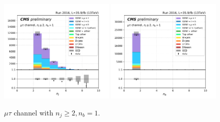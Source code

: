 \begin{figure}[ht]
    \includegraphics[width=0.49\textwidth]{chapters/Appendix/sectionPlots/figures/kinematics_pickles/mutau/1b/mutau_1b_nJets.pdf}
    \includegraphics[width=0.49\textwidth]{chapters/Appendix/sectionPlots/figures/kinematics_pickles/mutau/1b/mutau_1b_nBJets.pdf}
    
    \caption{$\mu\tau$ channel with $n_j\geq2, n_b=1$.}
\end{figure}

